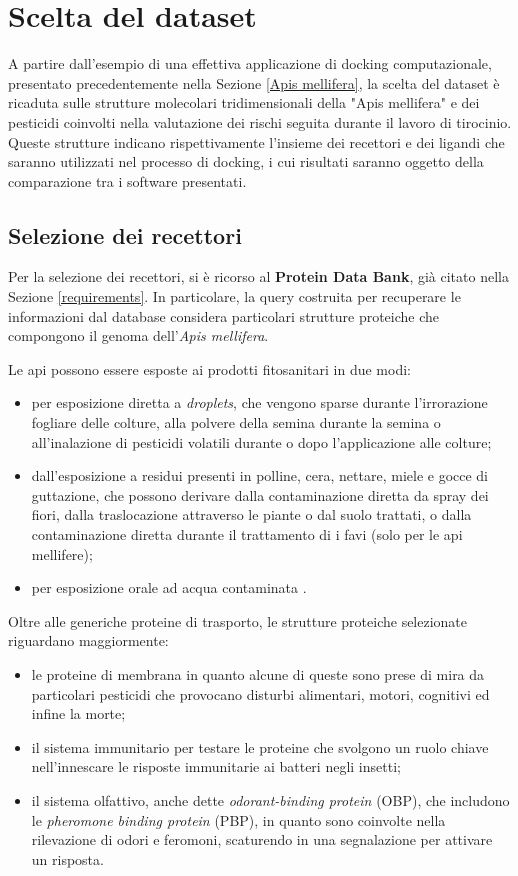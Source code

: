 \section{Scelta del dataset}
A partire dall'esempio di una effettiva applicazione di docking computazionale, presentato precedentemente nella Sezione \ref{Apis mellifera}, la scelta del dataset è ricaduta sulle strutture molecolari tridimensionali della "Apis mellifera" e dei pesticidi coinvolti nella valutazione dei rischi seguita durante il lavoro di tirocinio. Queste strutture indicano rispettivamente l'insieme dei recettori e dei ligandi che saranno utilizzati nel processo di docking, i cui risultati saranno oggetto della comparazione tra i software presentati. 

\subsection{Selezione dei recettori}
Per la selezione dei recettori, si è ricorso al \textbf{Protein Data Bank}, già citato nella Sezione \ref{requirements}. In particolare, la query costruita per recuperare le informazioni dal database considera particolari strutture proteiche che compongono il genoma dell'\textit{Apis mellifera}.

Le api possono essere esposte ai prodotti fitosanitari in due modi: 
\begin{itemize}
    \item per esposizione diretta a \textit{droplets}, che vengono sparse durante l'irrorazione fogliare delle colture, alla polvere della semina durante la semina o all'inalazione di pesticidi volatili durante o dopo l'applicazione alle colture;
    \item dall'esposizione a residui presenti in polline, cera, nettare, miele e gocce di guttazione, che possono derivare dalla contaminazione diretta da spray dei fiori, dalla traslocazione attraverso le piante o dal suolo trattati, o dalla contaminazione diretta durante il trattamento di i favi (solo per le api mellifere);
    \item per esposizione orale ad acqua contaminata \cite{sanchez-bayo_pesticide_2014}.
\end{itemize}

Oltre alle generiche proteine di trasporto, le strutture proteiche selezionate riguardano maggiormente:
\begin{itemize}
    \item le proteine di membrana in quanto alcune di queste sono prese di mira da particolari pesticidi che provocano disturbi alimentari, motori, cognitivi ed infine la morte;
    \item il sistema immunitario per testare le proteine che svolgono un ruolo chiave nell'innescare le risposte immunitarie ai batteri negli insetti;
    \item il sistema olfattivo, anche dette \textit{odorant-binding protein} (OBP), che includono le \textit{pheromone binding protein} (PBP), in quanto sono coinvolte nella rilevazione di odori e feromoni, scaturendo in una segnalazione per attivare un risposta.
\end{itemize}

